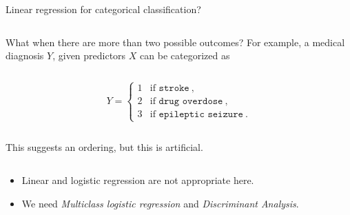 \documentclass[10pt,ignorenonframetext,]{beamer}
\providecommand{\tightlist}{%
  \setlength{\itemsep}{0pt}\setlength{\parskip}{0pt}}
\begin{document}
\begin{frame}

\begin{block}{Linear regression for categorical classification?}

\(~\)

What when there are more than two possible outcomes? For example, a
medical diagnosis \(Y\), given predictors \(X\) can be categorized as

\(~\)

\[Y = \left\{ \begin{array}{ll}
1 & \text{if } \texttt{stroke} \ , \\
2 & \text{if } \texttt{drug overdose} \ , \\
3 & \text{if } \texttt{epileptic seizure} \ .
\end{array} \right.\]

\(~\)

This suggests an ordering, but this is artificial.

\(~\)

\begin{itemize}
\tightlist
\item
  Linear and logistic regression are not appropriate here.
\item
  We need \emph{Multiclass logistic regression} and \emph{Discriminant
  Analysis}.
\end{itemize}

\end{block}

\end{frame}
\end{document}
